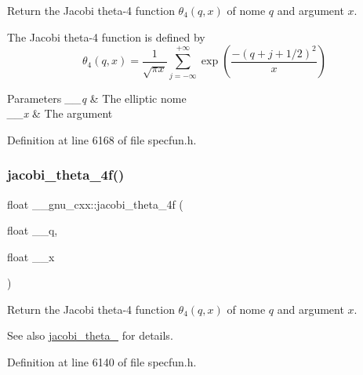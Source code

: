 Return the Jacobi theta-\/4 function $ \theta_4(q,x) $ of nome $ q $ and argument $ x $.

The Jacobi theta-\/4 function is defined by \[ \theta_4(q,x) = \frac{1}{\sqrt{\pi x}} \sum_{j=-\infty}^{+\infty} \exp\left( \frac{-(q + j + 1/2)^2}{x} \right) \]


\begin{DoxyParams}{Parameters}
{\em \+\_\+\+\_\+q} & The elliptic nome \\
\hline
{\em \+\_\+\+\_\+x} & The argument \\
\hline
\end{DoxyParams}


Definition at line 6168 of file specfun.\+h.

\mbox{\label{group__gnu__math__spec__func_ga57dcc5ae4b1a3d1e38adccad85204bca}} 
\subsubsection{\texorpdfstring{jacobi\+\_\+theta\+\_\+4f()}{jacobi\_theta\_4f()}}
{\footnotesize\ttfamily float \+\_\+\+\_\+gnu\+\_\+cxx\+::jacobi\+\_\+theta\+\_\+4f (\begin{DoxyParamCaption}\item[{float}]{\+\_\+\+\_\+q,  }\item[{float}]{\+\_\+\+\_\+x }\end{DoxyParamCaption})\hspace{0.3cm}{\ttfamily [inline]}}

Return the Jacobi theta-\/4 function $ \theta_4(q,x) $ of nome $ q $ and argument $ x $.

\begin{DoxySeeAlso}{See also}
\hyperlink{group__gnu__math__spec__func_ga676501b6284d5702a3dc61252e6c78ab}{jacobi\+\_\+theta\+\_} for details. 
\end{DoxySeeAlso}


Definition at line 6140 of file specfun.\+h.

\mbox{\label{group__gnu__math__spec__func_ga7c2a13198bdfd3f8cf1bc1758b1f56be}} 
